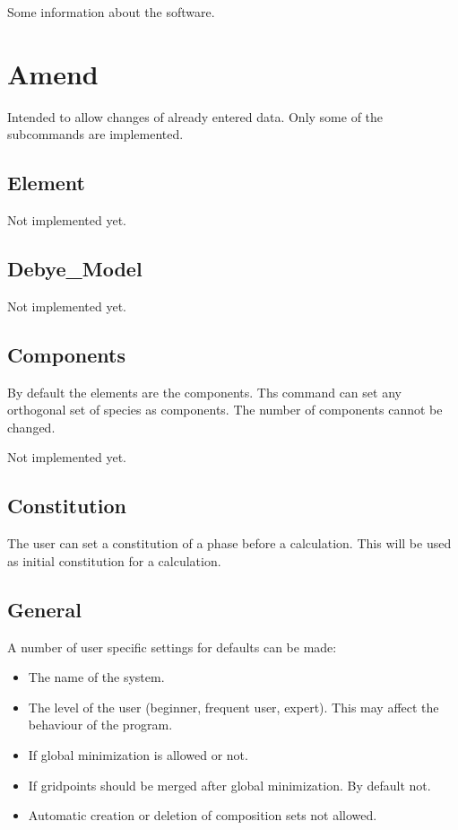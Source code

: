 \documentclass[12pt]{article}
\begin{document}
Some information about the software.

\section{Amend}

Intended to allow changes of already entered data. Only some
of the subcommands are implemented.

\subsection{Element}

Not implemented yet.

\subsection{Debye\_Model}

Not implemented yet.

\subsection{Components}

By default the elements are the components.  Ths command can set any
orthogonal set of species as components.  The number of components
cannot be changed.

Not implemented yet.

\subsection{Constitution}

The user can set a constitution of a phase before a calculation.  This
will be used as initial constitution for a calculation.

\subsection{General}

A number of user specific settings for defaults can be made:

\begin{itemize}
\item The name of the system.

\item The level of the user (beginner, frequent user, expert).  This
may affect the behaviour of the program.

\item If global minimization is allowed or not.

\item If gridpoints should be merged after global minimization.  By
default not.

\item  Automatic creation or deletion of composition sets not allowed.
\end{itemize}
\end{document}
